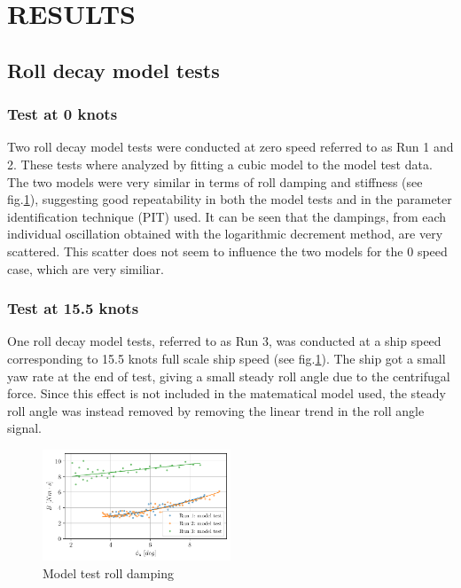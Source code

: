 \section*{RESULTS}\label{results}

    \subsection*{Roll decay model tests}\label{roll-decay-model-tests}

\subsubsection*{Test at 0 knots}\label{test-at-0-knots}

Two roll decay model tests were conducted at zero speed referred to as
Run 1 and 2.
These tests where analyzed by fitting a cubic model
to the model test data. The two models were very similar in terms of
roll damping and stiffness (see fig.\ref{fig:mdl}), suggesting
good repeatability in both the model tests and in the parameter
identification technique (PIT) used. It can be seen that the dampings,
from each individual oscillation obtained with the logarithmic decrement
method, are very scattered. This scatter does not seem to influence the
two models for the 0 speed case, which are very similiar.

    \subsubsection*{Test at 15.5 knots}\label{test-at-15.5-knots}

One roll decay model tests, referred to as Run 3, was conducted at a
ship speed corresponding to 15.5 knots full scale ship speed (see
fig.\ref{fig:mdl}). The ship got a small yaw rate
 at the end of test, giving a small steady roll angle due to the
centrifugal force. Since this effect is not included in the matematical
model used, the steady roll angle was instead removed by removing the
linear trend in the roll angle signal.

    

    \begin{figure}[H]
        \begin{center}\includegraphics[width = 0.5\textwidth]{figures/mdl.pdf}\end{center}
        \vspace{-1cm}
        \caption{Model test roll damping}
        \label{fig:mdl}
    \end{figure}
    
